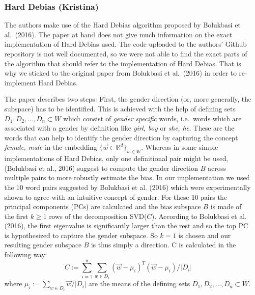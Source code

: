 \documentclass[
  english,
  man,floatsintext]{apa6}
\begin{document}
\hypertarget{hard-debias-kristina}{%
\subsubsection{Hard Debias (Kristina)}\label{hard-debias-kristina}}

The authors make use of the Hard Debias algorithm proposed by Bolukbasi et al.~(2016). The paper at hand does not give much information on the exact implementation of Hard Debias used. The code uploaded to the authors' Github repository is not well documented, so we were not able to find the exact parts of the algorithm that should refer to the implementation of Hard Debias. That is why we sticked to the original paper from Bolukbasi et al.~(2016) in order to re-implement Hard Debias.

The paper describes two steps: First, the gender direction (or, more generally, the subspace) has to be identified. This is achieved with the help of defining sets \(D_1, D_2, ..., D_n \subset W\) which consist of \emph{gender specific} words, i.e.~words which are associated with a gender by definition like \emph{girl, boy} or \emph{she, he}. These are the words that can help to identify the gender direction by capturing the concept \emph{female, male} in the embedding \(\{\vec{w}\in\mathbb{R}^d\}_{w\in W}\). Whereas in some simple implementations of Hard Debias, only one definitional pair might be used, (Bolukbasi et al., 2016) suggest to compute the gender direction \(B\) across multiple pairs to more robustly estimate the bias. In our implementation we used the 10 word pairs suggested by Bolukbasi et al. (2016) which were experimentally shown to agree with an intuitive concept of gender. For these 10 pairs the principal components (PCs) are calculated and the bias subspace \(B\) is made of the first \(k \geq 1\) rows of the decomposition SVD(\(C\)). According to Bolukbasi et al. (2016), the first eigenvalue is significantly larger than the rest and so the top PC is hypothesized to capture the gender subspace. So \(k=1\) is chosen and our resulting gender subspace \(B\) is thus simply a direction. C is calculated in the following way: \[C:=\sum_{i=1}^n \sum_{w\in D_i}(\vec{w}-\mu_i)^T(\vec{w}-\mu_i)/|D_i|\] where \(\mu_i := \sum_{w\in D_i}\vec{w}/|D_i|\) are the means of the defining sets \(D_1, D_2, ..., D_n \subset W\).
\end{document}

